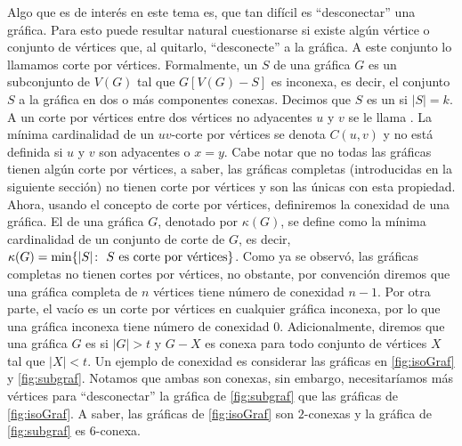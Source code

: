 Algo que es de inter\'es en este tema es, que tan dif\'icil es ``desconectar''
una gr\'afica. Para esto puede resultar natural cuestionarse si existe alg\'un
v\'ertice o conjunto de v\'ertices que, al quitarlo, ``desconecte'' a la
gr\'afica. A este conjunto lo llamamos corte por v\'ertices. Formalmente, un
 $S$ de una gr\'afica $G$ es un subconjunto de
$V(G)$ tal que $G[V(G)-S]$ es inconexa, es decir, el conjunto $S$
 a la gr\'afica en dos o m\'as componentes conexas. Decimos que
$S$ es un  si $|S|=k$. A un corte por
v\'ertices entre dos v\'ertices no adyacentes $u$ y $v$ se le llama
. La m\'inima cardinalidad de un $uv$-corte
por v\'ertices se denota $C(u,v)$ y no est\'a definida si $u$ y $v$ son
adyacentes o $x=y$.  Cabe notar que no todas las gr\'aficas tienen alg\'un corte
por v\'ertices, a saber, las gr\'aficas completas (introducidas en la siguiente
secci\'on) no tienen corte por v\'ertices y son las \'unicas con esta propiedad.
Ahora, usando el concepto de corte por v\'ertices, definiremos la conexidad de
una gr\'afica. El  de una gr\'afica $G$, denotado
por $\kappa(G)$, se define como la m\'inima cardinalidad de un conjunto de corte
de $G$, es decir, $\kappa(G)=\min \{|S| \colon\ S \textnormal{ es corte por
v\'ertices}\}$. Como ya se observ\'o, las gr\'aficas completas no tienen cortes
por v\'ertices, no obstante, por convenci\'on diremos que una gr\'afica completa
de $n$ v\'ertices tiene n\'umero de conexidad $n-1$. Por otra parte, el vac\'io
es un corte por v\'ertices en cualquier gr\'afica inconexa, por lo que una
gr\'afica inconexa tiene n\'umero de conexidad $0$. Adicionalmente, diremos que
una gr\'afica $G$ es  si $|G|>t$ y $G-X$ es conexa para todo
conjunto de v\'ertices $X$ tal que $|X|<t$. Un ejemplo de conexidad es
considerar las gr\'aficas en \cref{fig:isoGraf} y \cref{fig:subgraf}. Notamos
que ambas son conexas, sin embargo, necesitar\'iamos m\'as v\'ertices para
``desconectar'' la gr\'afica de \cref{fig:subgraf} que las gr\'aficas de
\cref{fig:isoGraf}. A saber, las gr\'aficas de \cref*{fig:isoGraf} son
$2$-conexas y la gr\'afica de \cref{fig:subgraf} es $6$-conexa.

